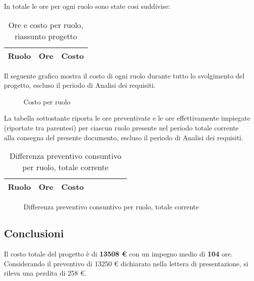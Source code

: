 	In totale le ore per ogni ruolo sono state cosi suddivise:

	\begin{table}[H]
	\centering
	\begin{tabular}{ l c c }
		\textbf{Ruolo} & \textbf{Ore} & \textbf{Costo} \\
		\hline
		
	\end{tabular}
	\caption{Ore e costo per ruolo, riassunto progetto}
	\end{table}

	Il seguente grafico mostra il costo di ogni ruolo durante tutto lo svolgimento del progetto, escluso il periodo di Analisi dei requisiti.

	\begin{figure}[H]
	\begin{tikzpicture}
		
	\end{tikzpicture}
	\caption{Costo per ruolo}
	\end{figure}

	La tabella sottostante riporta le ore preventivate e le ore effettivamente impiegate (riportate tra parentesi) per ciascun ruolo presente nel periodo totale corrente alla consegna del presente documento, escluso il periodo di Analisi dei requisiti.

	\begin{table}[H]
	\centering
	\begin{tabular}{lccccccc}
	\toprule
	    \textbf{Ruolo}  & \textbf{Ore} & \textbf{Costo} \\
	    \midrule
	    
	    \bottomrule
	\end{tabular}
	\caption{Differenza preventivo consuntivo per ruolo, totale corrente}
	\end{table}

	\begin{figure}[H]
	\centering
	\caption{Differenza preventivo consuntivo per ruolo, totale corrente}
	\end{figure}


	\subsection{Conclusioni}

	Il costo totale del progetto è di \textbf{13508 €} con un impegno medio di \textbf{104} ore. Considerando il preventivo di 13250 € dichiarato nella lettera di presentazione, si rileva una perdita di 258 €.